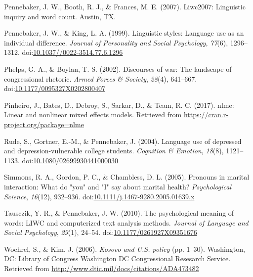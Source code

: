 \documentclass[english,,man,floatsintext]{apa6}
\begin{document}
\leavevmode\hypertarget{ref-Pennebaker2007}{}%
Pennebaker, J. W., Booth, R. J., \& Frances, M. E. (2007). Liwc2007: Linguistic inquiry and word count. Austin, TX.

\leavevmode\hypertarget{ref-Pennebaker1999}{}%
Pennebaker, J. W., \& King, L. A. (1999). Linguistic styles: Language use as an individual difference. \emph{Journal of Personality and Social Psychology}, \emph{77}(6), 1296--1312. doi:\href{https://doi.org/10.1037//0022-3514.77.6.1296}{10.1037//0022-3514.77.6.1296}

\leavevmode\hypertarget{ref-Phelps2002}{}%
Phelps, G. A., \& Boylan, T. S. (2002). Discourses of war: The landscape of congressional rhetoric. \emph{Armed Forces \& Society}, \emph{28}(4), 641--667. doi:\href{https://doi.org/10.1177/0095327X0202800407}{10.1177/0095327X0202800407}

\leavevmode\hypertarget{ref-Pinheiro2017}{}%
Pinheiro, J., Bates, D., Debroy, S., Sarkar, D., \& Team, R. C. (2017). nlme: Linear and nonlinear mixed effects models. Retrieved from \url{https://cran.r-project.org/package=nlme}

\leavevmode\hypertarget{ref-Rude2004}{}%
Rude, S., Gortner, E.-M., \& Pennebaker, J. (2004). Language use of depressed and depression-vulnerable college students. \emph{Cognition \& Emotion}, \emph{18}(8), 1121--1133. doi:\href{https://doi.org/10.1080/02699930441000030}{10.1080/02699930441000030}

\leavevmode\hypertarget{ref-Simmons2005}{}%
Simmons, R. A., Gordon, P. C., \& Chambless, D. L. (2005). Pronouns in marital interaction: What do "you" and "I" say about marital health? \emph{Psychological Science}, \emph{16}(12), 932--936. doi:\href{https://doi.org/10.1111/j.1467-9280.2005.01639.x}{10.1111/j.1467-9280.2005.01639.x}

\leavevmode\hypertarget{ref-Tausczik2010}{}%
Tausczik, Y. R., \& Pennebaker, J. W. (2010). The psychological meaning of words: LIWC and computerized text analysis methods. \emph{Journal of Language and Social Psychology}, \emph{29}(1), 24--54. doi:\href{https://doi.org/10.1177/0261927X09351676}{10.1177/0261927X09351676}

\leavevmode\hypertarget{ref-Woehrel2006}{}%
Woehrel, S., \& Kim, J. (2006). \emph{Kosovo and U.S. policy} (pp. 1--30). Washington, DC: Library of Congress Washington DC Congressional Resesarch Service. Retrieved from \url{http://www.dtic.mil/docs/citations/ADA473482}
\end{document}
